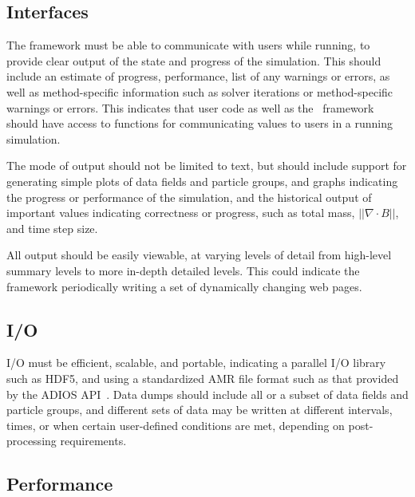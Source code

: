 \documentclass[10pt]{article}
\begin{document}
  
\subsection{Interfaces} \label{ss:require-interfaces}

The framework must be able to communicate with users while running, to
provide clear output of the state and progress of the simulation.
This should include an estimate of progress, performance, list of any
warnings or errors, as well as method-specific information such as
solver iterations or method-specific warnings or errors.  This
indicates that user code as well as the \cello\ framework should have
access to functions for communicating values to users in a running
simulation.

The mode of output should not be limited to text, but should include
support for generating simple plots of data fields and particle
groups, and graphs indicating the progress or performance of the
simulation, and the historical output of important values indicating
correctness or progress, such as total mass, $||\nabla \cdot B||$, and
time step size.

All output should be easily viewable, at varying levels of detail from
high-level summary levels to more in-depth detailed levels.  This
could indicate the framework periodically writing a set of dynamically
changing web pages.


\subsection{I/O } \label{ss:require-io}

I/O must be efficient, scalable, and portable, indicating a parallel
I/O library such as HDF5, and using a standardized AMR file format
such as that provided by the ADIOS API~\cite{LoKl08}.  Data dumps
should include all or a subset of data fields and particle groups, and
different sets of data may be written at different intervals, times,
or when certain user-defined conditions are met, depending on
post-processing requirements.

\subsection{Performance}  \label{ss:require-performance}
\end{document}
